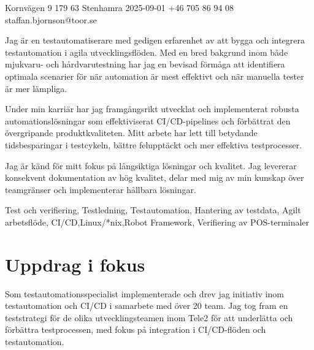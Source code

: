 \documentclass{sobCV}[2015/09/08]
\begin{document}
        {Kornvägen 9}
        {179 63 Stenhamra}
        {2025-09-01}
        {+46 705 86 94 08}
        {staffan.bjornson@toor.se}






   {
        Jag är en testautomatiserare med gedigen erfarenhet av att bygga och
        integrera testautomation i agila utvecklingsflöden. Med en bred
        bakgrund inom både mjukvaru- och hårdvarutestning har jag en bevisad
        förmåga att identifiera optimala scenarier för när automation är mest
        effektivt och när manuella tester är mer lämpliga.

        Under min karriär har jag framgångsrikt utvecklat och implementerat
        robusta automationslösningar som effektiviserat CI/CD-pipelines och
        förbättrat den övergripande produktkvaliteten. Mitt arbete har lett
        till betydande tidsbesparingar i testcykeln, bättre felupptäckt och mer
        effektiva testprocesser.

        Jag är känd för mitt fokus på långsiktiga lösningar och kvalitet. Jag
        levererar konsekvent dokumentation av hög kvalitet, delar med mig av
        min kunskap över teamgränser och implementerar hållbara lösningar.
   }{
        Test och verifiering,
        Testledning,
        Testautomation,
        Hantering av testdata,
        Agilt arbetsflöde,
        CI/CD,Linux/*nix,Robot Framework,
        Verifiering av POS-terminaler
    }


\section{Uppdrag i fokus}
    Som testautomationsspecialist implementerade och drev jag initiativ inom
    testautomation och CI/CD i samarbete med över 20 team. Jag tog fram en
    teststrategi för de olika utvecklingsteamen inom Tele2 för att underlätta
    och förbättra testprocessen, med fokus på integration i CI/CD-flöden och
    testautomation.
\end{document}
